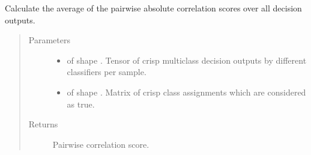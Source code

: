 \documentclass[letterpaper,10pt,english]{sphinxmanual}
\begin{document}
\begin{fulllineitems}
\label{\detokenize{pusion.evaluation.evaluation_metrics:pusion.evaluation.evaluation_metrics.pairwise_correlation}}
\sphinxAtStartPar
Calculate the average of the pairwise absolute correlation scores over all decision outputs.
\begin{quote}\begin{description}
\item[{Parameters}] \leavevmode\begin{itemize}
\item {} 
\sphinxAtStartPar
{} \textendash{}  of shape .
Tensor of crisp multiclass decision outputs by different classifiers per sample.

\item {} 
\sphinxAtStartPar
{} \textendash{}  of shape .
Matrix of crisp class assignments which are considered as true.

\end{itemize}

\item[{Returns}] \leavevmode
\sphinxAtStartPar
Pairwise correlation score.

\end{description}\end{quote}

\end{fulllineitems}

\end{document}
